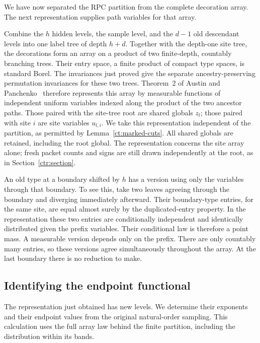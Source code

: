 We have now separated the RPC partition from the complete decoration
array.  The next representation supplies path variables for that array.

Combine the $h$ hidden levels, the sample level, and the $d-1$ old
descendant levels into one label tree of depth $h+d$.  Together with
the depth-one site tree, the decorations form an array on a product
of two finite-depth, countably branching trees.  Their entry space,
a finite product of compact type spaces, is standard Borel.
The invariances just proved give the separate ancestry-preserving
permutation invariances for these two trees.
Theorem~2 of Austin and Panchenko~\cite{AustinPanchenko2014} therefore
represents this array by measurable functions of independent uniform
variables indexed along the product of the two ancestor paths.
Those paired with the site-tree root are shared globals $z_l$;
those paired with site $i$ are site variables $u_{l,i}$.
We take this representation independent of the partition, as
permitted by Lemma~\ref{ct:marked-cuts}.  All shared globals are
retained, including the root global.  The representation concerns the
site array alone; fresh packet counts and signs are still drawn
independently at the root, as in Section~\ref{ctr:section}.

An old type at a boundary shifted by $h$ has a version using only
the variables through that boundary.  To see this, take two leaves
agreeing through the boundary and diverging immediately afterward.
Their boundary-type entries, for the same site, are equal almost
surely by the duplicated-entry property.  In the representation
these two entries are conditionally independent and identically
distributed given the prefix variables.  Their conditional law is
therefore a point mass.  A measurable version depends only on the
prefix.  There are only countably many entries, so these versions
agree simultaneously throughout the array.  At the last boundary
there is no reduction to make.

\subsection{Identifying the endpoint functional}\label{ct:sub-endpoint}

The representation just obtained has new levels.  We determine their
exponents and their endpoint values from the original natural-order
sampling.  This calculation uses the full array law behind the finite
partition, including the distribution within its bands.

